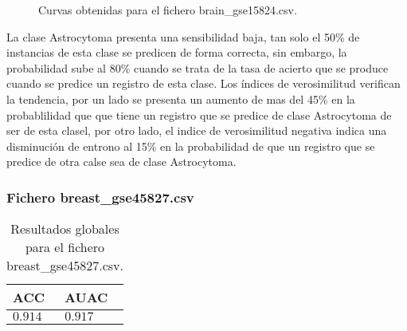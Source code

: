 \clearpage

\begin{figure}[htp]
    \centering
    \caption{Curvas obtenidas para el fichero brain\_gse15824.csv.}
    \label{fig:10}
\end{figure}

\bigbreak

La clase Astrocytoma presenta una sensibilidad baja, tan solo el 50\% de instancias de esta clase se predicen de forma correcta, sin embargo, la probabilidad sube al 80\% cuando se trata de la tasa de acierto que se produce cuando se predice un registro de esta clase. Los índices de verosimilitud verifican la tendencia, por un lado se presenta un aumento de mas del 45\% en la probablilidad que que tiene un registro que se predice de clase Astrocytoma de ser de esta clasel, por otro lado, el  indice de verosimilitud negativa indica una disminución de entrono al 15\% en la probabilidad de que un registro que se predice de otra calse sea de clase Astrocytoma. 

\clearpage


\subsubsection{Fichero breast\_gse45827.csv}

\begin{table}[htp]
    \small
    \centering
    \begin{tabularx}{\columnwidth}{Y Y}
        ACC       & AUAC    \\\hline
        $0.914$   & $0.917$ \\\hline
    \end{tabularx}
    \caption{Resultados globales para el fichero breast\_gse45827.csv.}
    \label{tab:12}
\end{table}

